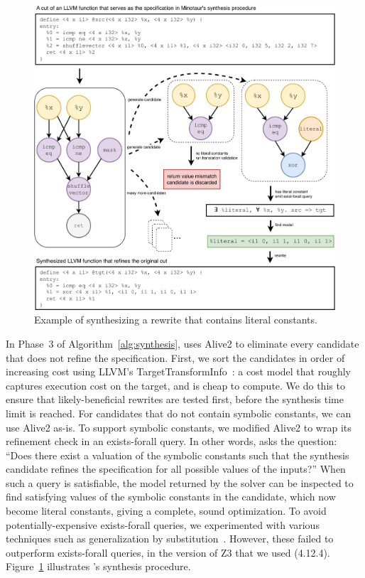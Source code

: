 \begin {figure}[tbp]
  \centering
  \includegraphics[width=0.8\linewidth]{figures/solve_literal.pdf}
  \caption{Example of synthesizing a rewrite that contains literal constants.}
  \label{fig:synthesizing}
\end{figure}

In Phase~3 of Algorithm~\ref{alg:synthesis}, \minotaur{} uses Alive2 to
eliminate every candidate that does not refine the specification.
%
First, we sort the candidates in order of increasing cost using LLVM's
TargetTransformInfo~\cite{tti}: a cost model that roughly captures
execution cost on the target, and is cheap to compute.
%
We do this to ensure that likely-beneficial rewrites are tested first,
before the synthesis time limit is reached.
%
For candidates that do not contain symbolic constants, we can use
Alive2 as-is.
%
To support symbolic constants, we modified Alive2 to wrap
its refinement check in an exists-forall query.
%
In other words, \minotaur{} asks the question: ``Does there exist a
valuation of the symbolic constants such that the synthesis candidate
refines the specification for all possible values of the inputs?''
%
When such a query is satisfiable, the model returned by the solver can
be inspected to find satisfying values of the symbolic constants
in the candidate, which now become literal constants, giving a
complete, sound optimization.
%
To avoid potentially-expensive exists-forall queries, we experimented
with various techniques such as generalization by
substitution~\cite{Dutertre15}.
%
However, these failed to outperform exists-forall queries, in the
version of Z3 that we used (4.12.4).
%
Figure~\ref{fig:synthesizing} illustrates \minotaur's synthesis procedure.


